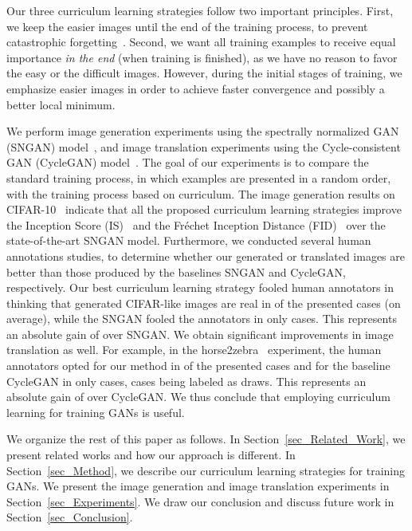 \documentclass[10pt,twocolumn,letterpaper]{article}
\begin{document}
Our three curriculum learning strategies follow two important principles. First, we keep the easier images until the end of the training process, to prevent catastrophic forgetting~\cite{Kirkpatrick-PNAS-2017,McCloskey-PLM-1989}. Second, we want all training examples to receive equal importance \emph{in the end} (when training is finished), as we have no reason to favor the easy or the difficult images. However, during the initial stages of training, we emphasize easier images in order to achieve faster convergence and possibly a better local minimum.

We perform image generation experiments using the spectrally normalized GAN (SNGAN) model~\cite{Miyato-ICLR-2018}, and image translation experiments using the Cycle-consistent GAN (CycleGAN) model~\cite{Zhu-ICCV-2017}. The goal of our experiments is to compare the standard training process, in which examples are presented in a random order, with the training process based on curriculum. The image generation results on CIFAR-10~\cite{Krizhevsky-TR-2009} indicate that all the proposed curriculum learning strategies improve the Inception Score (IS)~\cite{Salimans-NIPS-2016} and the Fr\'echet Inception Distance (FID)~\cite{Heusel-NIPS-2017} over the state-of-the-art SNGAN model. Furthermore, we conducted several human annotations studies, to determine whether our generated or translated images are better than those produced by the baselines SNGAN and CycleGAN, respectively. Our best curriculum learning strategy fooled human annotators in thinking that generated CIFAR-like images are real in  of the presented cases (on average), while the SNGAN fooled the annotators in only  cases. This represents an absolute gain of  over SNGAN. We obtain significant improvements in image translation as well. For example, in the horse2zebra~\cite{Zhu-ICCV-2017} experiment, the human annotators opted for our method in  of the presented cases and for the baseline CycleGAN in only  cases,  cases being labeled as draws. This represents an absolute gain of  over CycleGAN. We thus conclude that employing curriculum learning for training GANs is useful.

We organize the rest of this paper as follows. In Section~\ref{sec_Related_Work}, we present related works and how our approach is different.
In Section~\ref{sec_Method}, we describe our curriculum learning strategies for training GANs. We present the image generation and image translation experiments in Section~\ref{sec_Experiments}. We draw our conclusion and discuss future work in Section~\ref{sec_Conclusion}.
\end{document}
